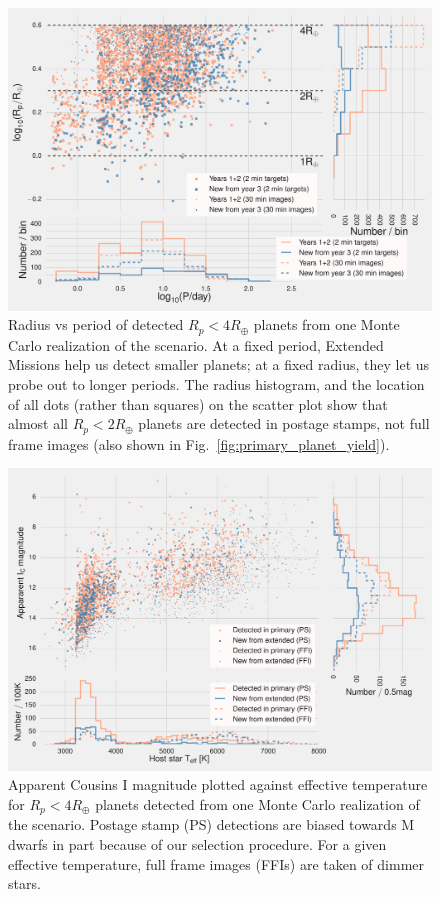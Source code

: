 \begin{figure}[t]
	\centering
	\includegraphics[]{figures/logR_vs_logP.pdf}
	\caption{Radius vs period of detected $R_p<4R_\oplus$ planets from one Monte Carlo realization of the \nhemi\:scenario.
	At a fixed period, Extended Missions help us detect smaller planets; at a fixed radius, they let us probe out to longer periods.
	The radius histogram, and the location of all dots (rather than squares) on the scatter plot show that almost all $R_p<2R_\oplus$ planets are detected in postage stamps, not full frame images (also shown in Fig.~\protect\ref{fig:primary_planet_yield}).}
	\label{fig:radius_vs_period_nhemi}
\end{figure}
\begin{figure}[t]
	\centering
	\includegraphics[]{figures/temp_imag_vs_teff_nhemi.pdf}
	\caption{Apparent Cousins I magnitude plotted against effective temperature for $R_p<4R_\oplus$ planets detected from one Monte Carlo realization of the \nhemi\:scenario. 
	Postage stamp (PS) detections are biased towards M dwarfs in part because of our selection procedure.
	For a given effective temperature, full frame images (FFIs) are taken of dimmer stars.}
	\label{fig:imag_vs_teff_nhemi}
\end{figure}

